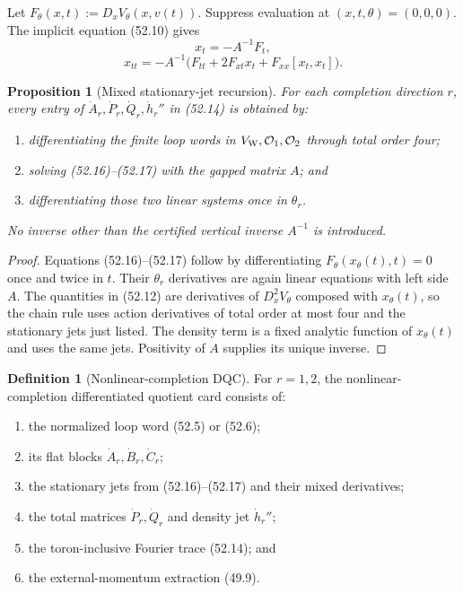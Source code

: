 \documentclass[11pt,oneside]{book}
\newtheorem{proposition}[theorem]{Proposition}
\theoremstyle{definition}
\newtheorem{definition}[theorem]{Definition}
\theoremstyle{remark}
\begin{document}
Let \(F_\theta(x,t):=D_xV_\theta(x,v(t))\).  Suppress evaluation at
\((x,t,\theta)=(0,0,0)\).  The implicit equation (52.10) gives
\[
 x_t=-A^{-1}F_t,                                              \tag{52.16}
\]
\[
 x_{tt}
 =-A^{-1}\bigl(F_{tt}+2F_{xt}x_t
                    +F_{xx}[x_t,x_t]\bigr).                  \tag{52.17}
\]

\begin{proposition}[Mixed stationary-jet recursion]
\label{prop:e8v52-stationary-recursion}
For each completion direction \(r\), every entry of
\(\dot A_r,\dot P_r,\dot Q_r,\dot h_r''\) in (52.14) is obtained
by:
\begin{enumerate}
\item differentiating the finite loop words in
      \(V_{\rm W},{\cal O}_1,{\cal O}_2\) through total order four;
\item solving (52.16)--(52.17) with the gapped matrix \(A\); and
\item differentiating those two linear systems once in
      \(\theta_r\).
\end{enumerate}
No inverse other than the certified vertical inverse \(A^{-1}\) is
introduced.
\end{proposition}

\begin{proof}
Equations (52.16)--(52.17) follow by differentiating
\(F_\theta(x_\theta(t),t)=0\) once and twice in \(t\).
Their \(\theta_r\) derivatives are again linear equations with
left side \(A\).  The quantities in (52.12) are derivatives of
\(D_x^2V_\theta\) composed with \(x_\theta(t)\), so the chain rule
uses action derivatives of total order at most four and the
stationary jets just listed.  The density term is a fixed analytic
function of \(x_\theta(t)\) and uses the same jets.  Positivity of
\(A\) supplies its unique inverse.
\end{proof}

\begin{definition}[Nonlinear-completion DQC]
\label{def:e8v52-NCDQC}
For \(r=1,2\), the nonlinear-completion differentiated quotient
card consists of:
\begin{enumerate}
\item the normalized loop word (52.5) or (52.6);
\item its flat blocks \(\dot A_r,\dot B_r,\dot C_r\);
\item the stationary jets from (52.16)--(52.17) and their mixed
      derivatives;
\item the total matrices \(\dot P_r,\dot Q_r\) and density jet
      \(\dot h_r''\);
\item the toron-inclusive Fourier trace (52.14); and
\item the external-momentum extraction (49.9).
\end{enumerate}
\end{definition}
\end{document}
